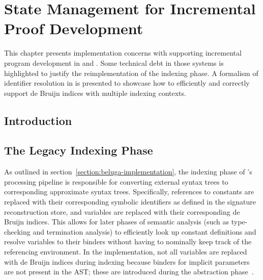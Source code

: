 \chapter{State Management for Incremental Proof Development}

This chapter presents implementation concerns with supporting incremental program development in \Beluga and \Harpoon.
Some technical debt in those systems is highlighted to justify the reimplementation of the indexing phase.
A formalism of identifier resolution in \Beluga is presented to showcase how to efficiently and correctly support de Bruijn indices with multiple indexing contexts.

\section{Introduction}






\section{The Legacy Indexing Phase}


As outlined in section~\ref{section:beluga-implementation}, the indexing phase of \Beluga's processing pipeline is responsible for converting external syntax trees to corresponding approximate syntax trees.
Specifically, references to constants are replaced with their corresponding symbolic identifiers as defined in the signature reconstruction store, and variables are replaced with their corresponding de Bruijn indices.
This allows for later phases of semantic analysis (such as type-checking and termination analysis) to efficiently look up constant definitions and resolve variables to their binders without having to nominally keep track of the referencing environment.
In the implementation, not all variables are replaced with de Bruijn indices during indexing because binders for implicit parameters are not present in the \ac{AST}; these are introduced during the abstraction phase~\cite{germain2010implementation}.

